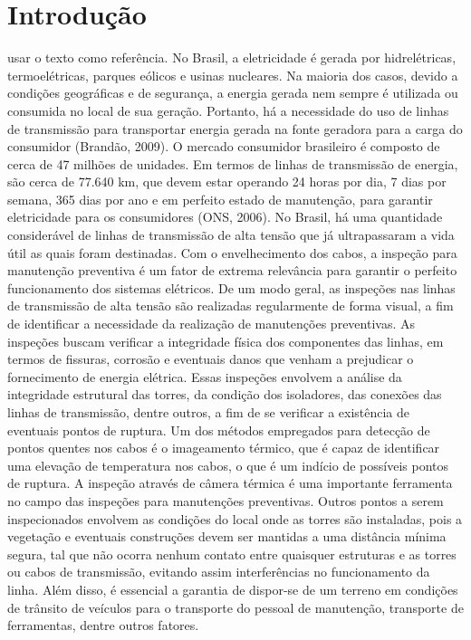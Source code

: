\chapter{Introdução}
usar o texto como referência.
No Brasil, a eletricidade é gerada por hidrelétricas, termoelétricas, parques eólicos e usinas nucleares. Na maioria dos casos, devido a condições geográficas e de segurança, a energia gerada nem sempre é utilizada ou consumida no local de sua geração. Portanto, há a necessidade do uso de linhas de transmissão para transportar energia gerada na fonte geradora para a carga do consumidor (Brandão, 2009). O mercado consumidor brasileiro é composto de cerca de 47 milhões de unidades. Em termos de linhas de transmissão de energia, são cerca de 77.640 km, que devem estar operando 24 horas por dia, 7 dias por semana, 365 dias por ano e em perfeito estado de manutenção, para garantir eletricidade para os consumidores (ONS, 2006).
No Brasil, há uma quantidade considerável de linhas de transmissão de alta tensão que já ultrapassaram a vida útil as quais foram destinadas. Com o envelhecimento dos cabos, a inspeção para manutenção preventiva é um fator de extrema relevância para garantir o perfeito funcionamento dos sistemas elétricos. 
De um modo geral, as inspeções nas linhas de transmissão de alta tensão são realizadas regularmente de forma visual, a fim de identificar a necessidade da realização de manutenções preventivas. 
As inspeções buscam verificar a integridade física dos componentes das linhas, em termos de fissuras, corrosão e eventuais danos que venham a prejudicar o fornecimento de energia elétrica. Essas inspeções envolvem a análise da integridade estrutural das torres, da condição dos isoladores, das conexões das linhas de transmissão, dentre outros, a fim de se verificar a existência de eventuais pontos de ruptura. 
Um dos métodos empregados para detecção de pontos quentes nos cabos é o imageamento térmico, que é capaz de identificar uma elevação de temperatura nos cabos, o que é um indício de possíveis pontos de ruptura. A inspeção através de câmera térmica é uma importante ferramenta no campo das inspeções para manutenções preventivas. 
Outros pontos a serem inspecionados envolvem as condições do local onde as torres são instaladas, pois a vegetação e eventuais construções devem ser mantidas a uma distância mínima segura, tal que não ocorra nenhum contato entre quaisquer estruturas e as torres ou cabos de transmissão, evitando assim interferências no funcionamento da linha. 
Além disso, é essencial a garantia de dispor-se de um terreno em condições de trânsito de veículos para o transporte do pessoal de manutenção, transporte de ferramentas, dentre outros fatores. 
